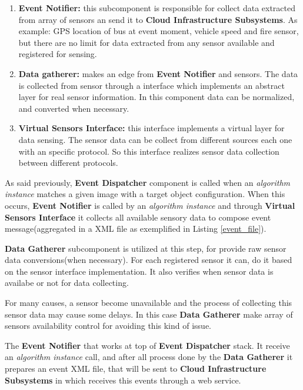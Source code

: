 \begin{enumerate}

\item \textbf{Event Notifier:} this subcomponent is responsible for collect data extracted from array of sensors an send it to \textbf{Cloud Infrastructure Subsystems}. As example: GPS location of bus at event moment, vehicle speed and fire sensor, but there are no limit for data extracted from any sensor available and registered for sensing.
\item \textbf{Data gatherer:} makes an edge from \textbf{Event Notifier} and sensors. The data is collected from sensor through a interface which implements an abstract layer for real sensor information. In this component data can be normalized, and converted when necessary.
\item \textbf{Virtual Sensors Interface:} this interface implements a virtual layer for data sensing. The sensor data can be collect from different sources each one with an specific protocol. So this interface realizes sensor data collection between different protocols.

\end{enumerate}

As said previously, \textbf{Event Dispatcher} component is called when an \textit{algorithm instance} matches a given image with a target object configuration. When this occurs, \textbf{Event Notifier} is called by an \textit{algorithm instance} and through \textbf{Virtual Sensors Interface} it collects all available sensory data to compose event message(aggregated in a XML file as exemplified in Listing \ref{event_file}).

\textbf{Data Gatherer} subcomponent is utilized at this step, for provide raw sensor data conversions(when necessary). For each registered sensor it can, do it based on the sensor interface implementation. It also verifies when sensor data is availabe or not for data collecting. 

For many causes, a sensor become unavailable and the process of collecting this sensor data may cause some delays. In this case \textbf{Data Gatherer} make array of sensors availability control for avoiding this kind of issue.

The \textbf{Event Notifier} that works at top of \textbf{Event Dispatcher} stack. It receive an \textit{algorithm instance} call, and after all process done by the \textbf{Data Gatherer} it prepares an event XML file, that will be sent to \textbf{Cloud Infrastructure Subsystems} in which receives this events through a web service.


